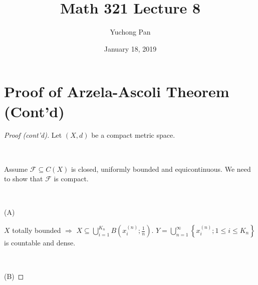 \documentclass[letterpaper, reqno,11pt]{article}
\begin{document}
\title{Math 321 Lecture 8}
\author{Yuchong Pan}
\date{January 18, 2019}
\newtheorem{thm}{Theorem}
\newtheorem{defn}{Definition}
\newtheorem*{remark}{Remark}
\newtheorem{claim}{Claim}
\newtheorem{cor}{Corollary}
\newtheorem{lemma}{Lemma}
\maketitle
%

\section{Proof of Arzela-Ascoli Theorem (Cont'd)}

\begin{proof}[Proof (cont'd)]
  Let $(X, d)$ be a compact metric space.

  ~

   Assume $\mathcal F \subseteq C(X)$ is closed, uniformly bounded and equicontinuous. We need to show that $\mathcal F$ is compact.

  ~
  
  {\centering (A) \par}
  
  \noindent{}

  \noindent $X$ totally bounded $\Rightarrow$ $X \subseteq \bigcup_{i = 1}^{K_n} B\left(x_i^{(n)}; \frac{1}{n}\right)$. $Y = \bigcup_{n = 1}^\infty \left\{ x_i^{(n)} ; 1 \leq i \leq K_n \right\}$ is countable and dense.

  ~
  
  {\centering (B) \par}

  \noindent{}


\end{proof}
\end{document}
